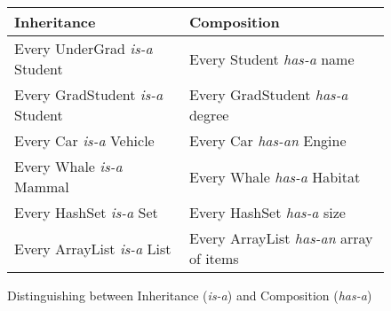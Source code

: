 






\begin {figure}

\begin {tabular} {l | l}
Inheritance  & Composition  		\\
\hline
Every UnderGrad \emph{is-a} Student		&  
	Every Student \emph{has-a} name		\\
Every GradStudent \emph{is-a} Student		&
	Every GradStudent \emph{has-a} degree	\\
Every Car \emph{is-a} Vehicle			&
	Every Car \emph{has-an} Engine		\\
Every Whale \emph{is-a} Mammal			&
	Every Whale \emph{has-a} Habitat		\\
Every HashSet \emph{is-a} Set 			&
	Every HashSet \emph{has-a} size 	\\
Every ArrayList \emph{is-a} List		&
	Every ArrayList \emph{has-an} array of items 	\\



\end {tabular}

\caption {Distinguishing between Inheritance (\emph {is-a})
and Composition (\emph {has-a}) }


\label {fig:isAhasA}

\end {figure}


